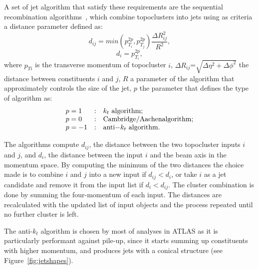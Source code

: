 A set of jet algorithm that satisfy these requirements are the sequential recombination
algorithms~\cite{ref:Cacciari2008,ref:Cacciari2006,ref:fastjet}, which combine topoclusters
into jets using as criteria a distance parameter defined as:
\begin{equation}
d_{ij}=min(p_{T_i}^{2p},p_{T_j}^{2p})\frac{\Delta R_{ij}^{2}}{R^{2}},
\end{equation}
\begin{equation}
d_{i}=p_{T_i}^{2p},
\end{equation}
where $p_{Ti}$ is the transverse momentum of topocluster $i$, 
$\Delta R_{ij}$=$\sqrt{\Delta\eta^{2}+\Delta\phi^{2}}$ the distance 
between constituents $i$ and
$j$, $R$ a parameter of the algorithm that approximately controls the size
of the jet, $p$ the parameter that defines the type of algorithm as:
\begin{equation}\label{eq:jetalgp}
\begin{array}{lcl}
p = 1 &:& k_t {\rm\ algorithm};\\
p = 0 &:& {\rm Cambridge/Aachen algorithm};\\
p = -1 &:& {\rm anti-}k_t {\rm\ algorithm}.
\end{array}
\end{equation}

The algorithms compute $d_{ij}$, the distance between the two topocluster
inputs $i$ and $j$, and $d_{i}$,  the distance between the input $i$
and the beam axis in the momentum space.
By computing the minimum of the two distances the choice made is
to combine $i$ and $j$ into a new input if $d_{ij}<d_{i}$, or take
$i$ as a jet candidate and remove it from the input list if $d_{i}<d_{ij}$. 
The cluster combination is done by summing the four-momentum of each input.
The distances are recalculated with the updated list of input
objects and the process repeated until no further cluster is left.

The anti-$k_t$ algorithm is chosen by most of analyses in ATLAS as it is particularly 
performant against pile-up, since it starts summing up 
constituents with higher momentum, and produces jets with a conical
structure (see Figure~\ref{fig:jetshapes}).

